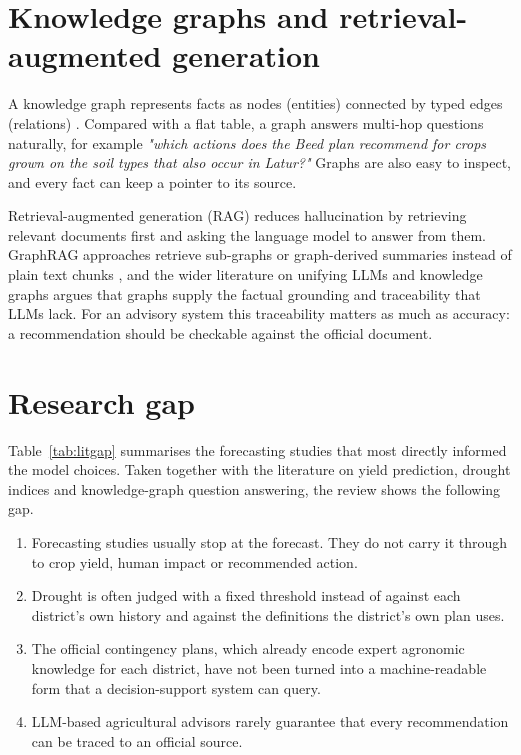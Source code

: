 \section{Knowledge graphs and retrieval-augmented generation}
A knowledge graph represents facts as nodes (entities) connected by typed edges (relations) \cite{hogan2021knowledge}. Compared with a flat table, a graph answers multi-hop questions naturally, for example \emph{"which actions does the Beed plan recommend for crops grown on the soil types that also occur in Latur?"} Graphs are also easy to inspect, and every fact can keep a pointer to its source.

Retrieval-augmented generation (RAG) \cite{lewis2020retrieval} reduces hallucination by retrieving relevant documents first and asking the language model to answer from them. GraphRAG approaches retrieve sub-graphs or graph-derived summaries instead of plain text chunks \cite{edge2024local}, and the wider literature on unifying LLMs and knowledge graphs \cite{pan2024unifying} argues that graphs supply the factual grounding and traceability that LLMs lack. For an advisory system this traceability matters as much as accuracy: a recommendation should be checkable against the official document.

\section{Research gap}
Table~\ref{tab:litgap} summarises the forecasting studies that most directly informed the model choices. Taken together with the literature on yield prediction, drought indices and knowledge-graph question answering, the review shows the following gap.

\begin{enumerate}
	\item Forecasting studies usually stop at the forecast. They do not carry it through to crop yield, human impact or recommended action.
	\item Drought is often judged with a fixed threshold instead of against each district's own history and against the definitions the district's own plan uses.
	\item The official contingency plans, which already encode expert agronomic knowledge for each district, have not been turned into a machine-readable form that a decision-support system can query.
	\item LLM-based agricultural advisors rarely guarantee that every recommendation can be traced to an official source.
\end{enumerate}

